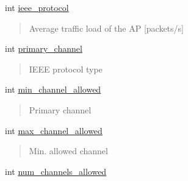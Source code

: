 \begin{DoxyCompactItemize}
int \hyperlink{structCapabilities_a619b798b45dc3bfcb0456b663918e534}{ieee\+\_\+protocol}
\begin{DoxyCompactList}\small\item\em \begin{quote}
Average traffic load of the AP \mbox{[}packets/s\mbox{]} \end{quote}
\end{DoxyCompactList}\item 
\mbox{\label{structCapabilities_acef3010e3cc7c8031e00824c20fce068}} 
int \hyperlink{structCapabilities_acef3010e3cc7c8031e00824c20fce068}{primary\+\_\+channel}
\begin{DoxyCompactList}\small\item\em \begin{quote}
I\+E\+EE protocol type \end{quote}
\end{DoxyCompactList}\item 
\mbox{\label{structCapabilities_a5f4060c7db110398fd90c25f13599535}} 
int \hyperlink{structCapabilities_a5f4060c7db110398fd90c25f13599535}{min\+\_\+channel\+\_\+allowed}
\begin{DoxyCompactList}\small\item\em \begin{quote}
Primary channel \end{quote}
\end{DoxyCompactList}\item 
\mbox{\label{structCapabilities_ade2db61b6d5cfa458e31b56810a7a7ee}} 
int \hyperlink{structCapabilities_ade2db61b6d5cfa458e31b56810a7a7ee}{max\+\_\+channel\+\_\+allowed}
\begin{DoxyCompactList}\small\item\em \begin{quote}
Min. allowed channel \end{quote}
\end{DoxyCompactList}\item 
\mbox{\label{structCapabilities_a7bbbcd7bbe2fce0b9d3a3237376759af}} 
int \hyperlink{structCapabilities_a7bbbcd7bbe2fce0b9d3a3237376759af}{num\+\_\+channels\+\_\+allowed}
\begin{DoxyCompactList}\small\item\em \begin{quote}

\end{quote}
\end{DoxyCompactList}
\end{DoxyCompactItemize}
